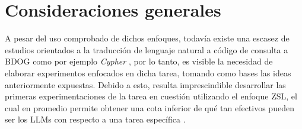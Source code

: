 \section{Consideraciones generales} \label{approaches_conclusions}

A pesar del uso comprobado de dichos enfoques, todavía existe una escasez de estudios orientados a la traducción de lenguaje natural a código de consulta a BDOG como por ejemplo \textit{Cypher} \cite{gpt4graphpaper2023}, por lo tanto, es visible la necesidad de elaborar experimentos enfocados en dicha tarea, tomando como bases las ideas anteriormente expuestas. Debido a esto, resulta imprescindible desarrollar las primeras experimentaciones de la tarea en cuestión utilizando el enfoque ZSL, el cual en promedio permite obtener una cota inferior de qué tan efectivos pueden ser los LLMs con respecto a una tarea específica \cite{llmsoverview}.


